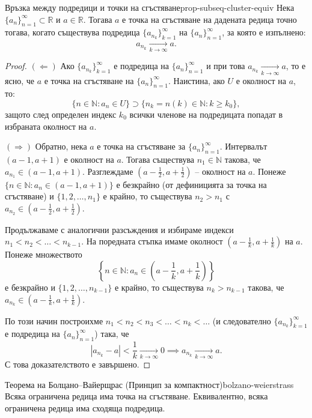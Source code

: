 \begin{theorem}{Връзка между подредици и точки на сгъстяване}{prop-subseq-cluster-equiv}
Нека $\{a_n\}_{n=1}^{\infty} \subset \mathbb{R}$ и $a \in \mathbb{R}$. Тогава $a$ е точка на сгъстяване на дадената редица точно тогава, когато съществува подредица $\{a_{n_k}\}_{k=1}^{\infty}$ на $\{a_n\}_{n=1}^{\infty}$, за която е изпълнено:
\[
a_{n_k} \xrightarrow[k\to\infty]{} a.
\]
\end{theorem}

\begin{proof}
$(\Leftarrow)$ Ако $\{a_{n_k}\}_{k=1}^{\infty}$ е подредица на $\{a_n\}_{n=1}^{\infty}$ и при това $a_{n_k} \xrightarrow[k\to\infty]{} a$, то е ясно, че $a$ е точка на сгъстяване на $\{a_n\}_{n=1}^{\infty}$. Наистина, ако $U$ е околност на $a$, то:
\[
\{n \in \mathbb{N} : a_n \in U\} \supset \{n_k = n(k) \in \mathbb{N} : k \ge k_0\},
\]
защото след определен индекс $k_0$ всички членове на подредицата попадат в избраната околност на $a$.

$(\Rightarrow)$ Обратно, нека $a$ е точка на сгъстяване за $\{a_n\}_{n=1}^{\infty}$. Интервалът $(a - 1, a + 1)$ е околност на $a$. Тогава съществува $n_1 \in \mathbb{N}$ такова, че $a_{n_1} \in (a - 1, a + 1)$. Разглеждаме $\left(a - \frac{1}{2}, a + \frac{1}{2}\right)$ -- околност на $a$. Понеже $\{n \in \mathbb{N} : a_n \in (a - 1, a + 1)\}$ е безкрайно (от дефиницията за точка на сгъстяване) и $\{1, 2, \dots, n_1\}$ е крайно, то съществува $n_2 > n_1$ с $a_{n_2} \in \left(a - \frac{1}{2}, a + \frac{1}{2}\right)$.

Продължаваме с аналогични разсъждения и избираме индекси $n_1 < n_2 < \dots < n_{k-1}$. На поредната стъпка имаме околност $\left(a - \frac{1}{k}, a + \frac{1}{k}\right)$ на $a$. Понеже множеството
\[
\left\{n \in \mathbb{N} : a_n \in \left(a - \frac{1}{k}, a + \frac{1}{k}\right)\right\}
\]
е безкрайно и $\{1, 2, \dots, n_{k-1}\}$ е крайно, то съществува $n_k > n_{k-1}$ такова, че $a_{n_k} \in \left(a - \frac{1}{k}, a + \frac{1}{k}\right)$.

По този начин построихме $n_1 < n_2 < n_3 < \dots < n_k < \dots$ (и следователно $\{a_{n_k}\}_{k=1}^{\infty}$ е подредица на $\{a_n\}_{n=1}^{\infty}$) така, че
\[
|a_{n_k} - a| < \frac{1}{k} \xrightarrow[k\to\infty]{} 0 \implies a_{n_k} \xrightarrow[k\to\infty]{} a.
\]
С това доказателството е завършено.
\end{proof}

\begin{theorem}{Теорема на Болцано--Вайерщрас (Принцип за компактност)}{bolzano-weierstrass}
Всяка ограничена редица има точка на сгъстяване. Еквивалентно, всяка ограничена редица има сходяща подредица.
\end{theorem}

